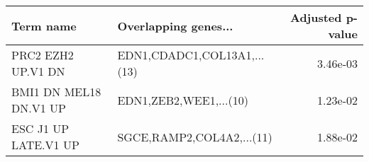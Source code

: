 \begin{tabular}{llr}
\toprule
             Term name &        Overlapping genes... &  Adjusted p-value \\
\midrule
    PRC2 EZH2 UP.V1 DN & EDN1,CDADC1,COL13A1,...(13) &          3.46e-03 \\
BMI1 DN MEL18 DN.V1 UP &      EDN1,ZEB2,WEE1,...(10) &          1.23e-02 \\
  ESC J1 UP LATE.V1 UP &   SGCE,RAMP2,COL4A2,...(11) &          1.88e-02 \\
\bottomrule
\end{tabular}
